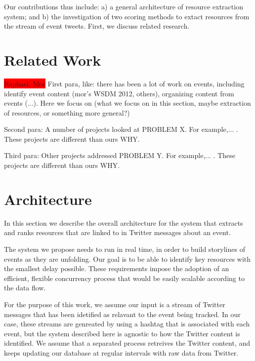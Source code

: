 \documentclass{sig-alternate}
\newcommand{\todo}[1]{\colorbox{red}{#1}}
\begin{document}
Our contributions thus include: a) a general architecture of resource extraction system; and b) the investigation of two scoring methods to extact resources from the stream of event tweets. First, we discuss related research.


\section{Related Work}
\label{sec:related-work}

\todo{Raphael, Mor}
First para, like: there has been a lot of work on events, including identify event content (mor's WSDM 2012, others), organizing content from events (...). Here we focus on (what we focus on in this section, maybe extraction of resources, or something more general?)

Second para: A number of projects looked at PROBLEM X. For example,... . These projects are different than ours WHY.

Third para: Other projects addressed PROBLEM Y. For example,... . These projects are different than ours WHY.



\section{Architecture}
\label{sec:architecture}
In this section we describe the overall architecture for the system that extracts and ranks resources that are linked to in Twitter messages about an event. 

The system we propose needs to run in real time, in order to build storylines of events as they are unfolding. Our goal is to be able to identify key resources with the smallest delay possible. These requirements impose the adoption of an efficient, flexible concurrency process that would be easily scalable according to the data flow. 

For the purpose of this work, we assume our input is a stream of Twitter messages that has been idetified as relavant to the event being tracked. In our case, these streams are genreated by using a hashtag that is associated with each event, but the system described here is agnostic to how the Twitter content is identified. We assume that a separated process retreives the Twitter content, and keeps updating our database at regular intervals with raw data from Twitter. 
\end{document}
